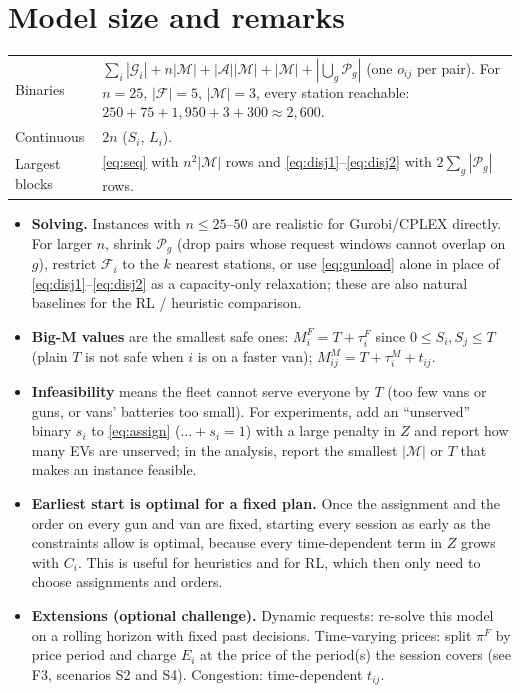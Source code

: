 \documentclass[11pt,a4paper]{article}
\newcommand{\F}{\mathcal{F}}
\newcommand{\G}{\mathcal{G}}
\newcommand{\M}{\mathcal{M}}
\newcommand{\A}{\mathcal{A}}
\begin{document}
\section{Model size and remarks}

\begin{tabularx}{\textwidth}{@{}lX@{}}
\toprule
Binaries & $\sum_i|\G_i| + n|\M| + |\A||\M| + |\M| + |\bigcup_g\mathcal{P}_g|$ (one $o_{ij}$ per pair). For $n=25$, $|\F|=5$, $|\M|=3$, every station reachable: $250+75+1{,}950+3+300\approx 2{,}600$. \\
Continuous & $2n$ ($S_i$, $L_i$). \\
Largest blocks & \eqref{eq:seq} with $n^2|\M|$ rows and \eqref{eq:disj1}--\eqref{eq:disj2} with $2\sum_g|\mathcal{P}_g|$ rows. \\
\bottomrule
\end{tabularx}

\begin{itemize}[leftmargin=1.4em,itemsep=2pt]
  \item \textbf{Solving.} Instances with $n\le 25$--$50$ are realistic for Gurobi/CPLEX directly. For larger $n$, shrink $\mathcal{P}_g$ (drop pairs whose request windows cannot overlap on $g$), restrict $\F_i$ to the $k$ nearest stations, or use \eqref{eq:gunload} alone in place of \eqref{eq:disj1}--\eqref{eq:disj2} as a capacity-only relaxation; these are also natural baselines for the RL / heuristic comparison.
  \item \textbf{Big-M values} are the smallest safe ones: $M^F_i=T+\tau^F_i$ since $0\le S_i,S_j\le T$ (plain $T$ is not safe when $i$ is on a faster van); $M^M_{ij}=T+\tau^M_i+t_{ij}$.
  \item \textbf{Infeasibility} means the fleet cannot serve everyone by $T$ (too few vans or guns, or vans' batteries too small). For experiments, add an ``unserved'' binary $s_i$ to \eqref{eq:assign} ($\dots+s_i=1$) with a large penalty in $Z$ and report how many EVs are unserved; in the analysis, report the smallest $|\M|$ or $T$ that makes an instance feasible.
  \item \textbf{Earliest start is optimal for a fixed plan.} Once the assignment and the order on every gun and van are fixed, starting every session as early as the constraints allow is optimal, because every time-dependent term in $Z$ grows with $C_i$. This is useful for heuristics and for RL, which then only need to choose assignments and orders.
  \item \textbf{Extensions (optional challenge).} Dynamic requests: re-solve this model on a rolling horizon with fixed past decisions. Time-varying prices: split $\pi^F$ by price period and charge $E_i$ at the price of the period(s) the session covers (see F3, scenarios S2 and S4). Congestion: time-dependent $t_{ij}$.
\end{itemize}
\end{document}
